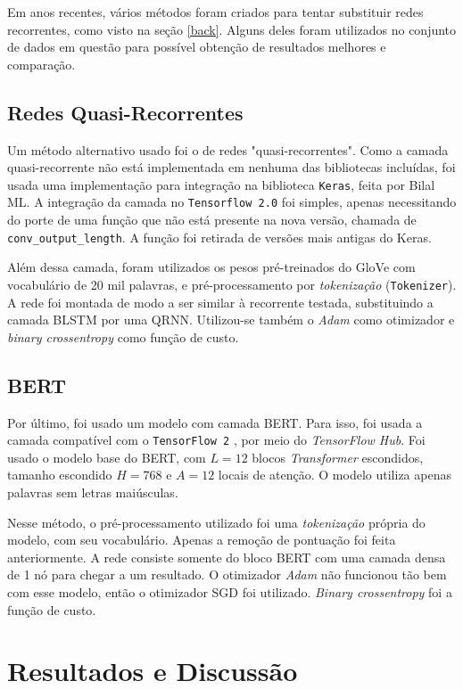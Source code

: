 \documentclass[twoside,conference,a4paper]{IEEEtran}
\begin{document}
    Em anos recentes, vários métodos foram criados para tentar substituir redes recorrentes, como visto na seção \ref{back}. Alguns deles foram utilizados no conjunto de dados em questão para possível obtenção de resultados melhores e comparação.
    
\subsection{Redes Quasi-Recorrentes}
    Um método alternativo usado foi o de redes "quasi-recorrentes". Como a camada quasi-recorrente não está implementada em nenhuma das bibliotecas incluídas, foi usada uma implementação para integração na biblioteca \texttt{Keras}, feita por Bilal ML\cite{keras-qrnn}. A integração da camada no \texttt{Tensorflow 2.0} foi simples, apenas necessitando do porte de uma função que não está presente na nova versão, chamada de \texttt{conv\_output\_length}. A função foi retirada de versões mais antigas do Keras.
    
    Além dessa camada, foram utilizados os pesos pré-treinados do GloVe com vocabulário de 20 mil palavras, e pré-processamento por \textit{tokenização} (\texttt{Tokenizer}). A rede foi montada de modo a ser similar à recorrente testada, substituindo a camada BLSTM por uma QRNN. Utilizou-se também o \textit{Adam} como otimizador e \textit{binary crossentropy} como função de custo.

\subsection{BERT}
    Por último, foi usado um modelo com camada BERT. Para isso, foi usada a camada compatível com o \texttt{TensorFlow 2} \cite{bert_tf}, por meio do \textit{TensorFlow Hub}. Foi usado o modelo base do BERT, com $L=12$ blocos \textit{Transformer} escondidos, tamanho escondido $H=768$ e $A=12$ locais de atenção. O modelo utiliza apenas palavras sem letras maiúsculas.
    
    Nesse método, o pré-processamento utilizado foi uma \textit{tokenização} própria do modelo, com seu vocabulário. Apenas a remoção de pontuação foi feita anteriormente. A rede consiste somente do bloco BERT com uma camada densa de 1 nó para chegar a um resultado. O otimizador \textit{Adam} não funcionou tão bem com esse modelo, então o otimizador SGD foi utilizado. \textit{Binary crossentropy} foi a função de custo.


\section{Resultados e Discussão} \label{results}
\end{document}
